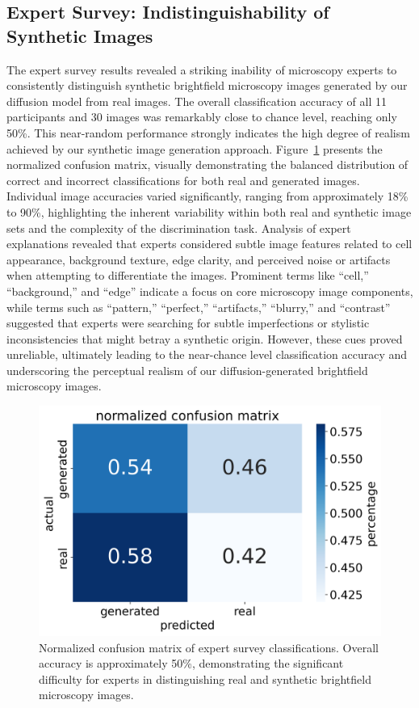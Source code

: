 \subsection{Expert Survey: Indistinguishability of Synthetic Images}
\label{subsec:expert-survey:-indistinguishability-of-synthetic-images}
The expert survey results revealed a striking inability of microscopy experts to consistently distinguish synthetic brightfield microscopy images generated by our diffusion model from real images.
The overall classification accuracy of all 11 participants and 30 images was remarkably close to chance level, reaching only 50\%.
This near-random performance strongly indicates the high degree of realism achieved by our synthetic image generation approach.
Figure~\ref{fig:conf_matrix} presents the normalized confusion matrix, visually demonstrating the balanced distribution of correct and incorrect classifications for both real and generated images.
Individual image accuracies varied significantly, ranging from approximately 18\% to 90\%, highlighting the inherent variability within both real and synthetic image sets and the complexity of the discrimination task.
Analysis of expert explanations revealed that experts considered subtle image features related to cell appearance, background texture, edge clarity, and perceived noise or artifacts when attempting to differentiate the images.
Prominent terms like ``cell,'' ``background,'' and ``edge'' indicate a focus on core microscopy image components, while terms such as ``pattern,'' ``perfect,'' ``artifacts,'' ``blurry,'' and ``contrast'' suggested that experts were searching for subtle imperfections or stylistic inconsistencies that might betray a synthetic origin.
However, these cues proved unreliable, ultimately leading to the near-chance level classification accuracy and underscoring the perceptual realism of our diffusion-generated brightfield microscopy images.
\begin{figure}
    \centering
    \includegraphics[width=0.75\linewidth]{norm_confusion_matrix}
    \caption{Normalized confusion matrix of expert survey classifications. Overall accuracy is approximately 50\%, demonstrating the significant difficulty for experts in distinguishing real and synthetic brightfield microscopy images.}
    \label{fig:conf_matrix}
\end{figure}

